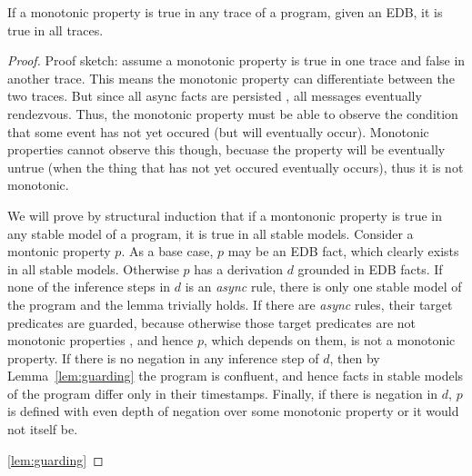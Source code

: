 \begin{lemma}
If a monotonic property is true in any trace of a program, given an EDB, it is true in all traces. 
\end{lemma}
\begin{proof}
Proof sketch: assume a monotonic property is true in one trace and false in another trace.  This means the monotonic property can differentiate between the two traces.  But since all async facts are persisted , all messages eventually rendezvous.  Thus, the monotonic property must be able to observe the condition that some event has not yet occured (but will eventually occur).   Monotonic properties cannot observe this though, becuase the property will be eventually untrue (when the thing that has not yet occured eventually occurs), thus it is not monotonic. 

We will prove by structural induction that if a montononic property is true in any stable
model of a \lang program, it is true in all stable models.  Consider a montonic property
$p$.  As a base case, $p$ may be an EDB fact, which clearly exists in all stable models.
Otherwise $p$ has a derivation $d$ grounded in EDB facts.  If none of the inference 
steps in $d$ is an {\em async} rule, there is only one stable model of the program  and
the lemma trivially holds.  If there are {\em async} rules, their target predicates are guarded,
because otherwise those target predicates are not monotonic
properties , and hence $p$, which depends on them, is not a monotonic property.  If there 
is no negation in any inference step of $d$, then by Lemma~\ref{lem:guarding} the program
is confluent, and hence facts in stable models of the program differ only in their timestamps.
Finally, if there is negation in $d$, $p$ is defined with even depth of negation over some
monotonic property or it would not itself be.    

\ref{lem:guarding}
\end{proof}

